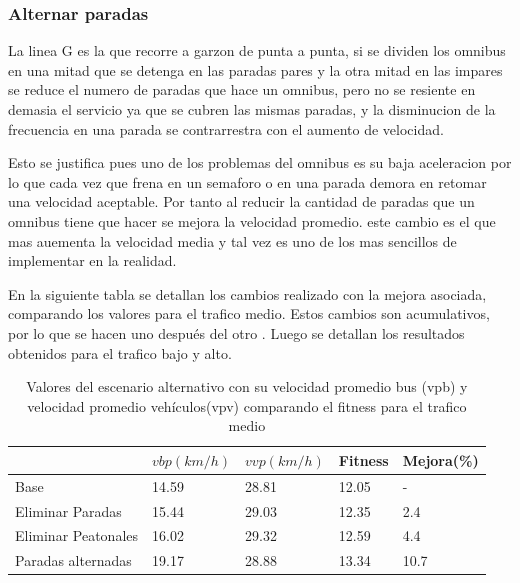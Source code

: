 \subsubsection{Alternar paradas}

La linea G es la que recorre a garzon de punta a punta, si se dividen los omnibus en una mitad que se detenga en las paradas pares y la otra mitad en las impares se reduce el numero de paradas que hace un omnibus, pero no se resiente en demasia el servicio ya que se cubren las mismas paradas, y la disminucion de la frecuencia en una parada se contrarrestra con el aumento de velocidad.

Esto se justifica pues uno de los problemas del omnibus es su baja aceleracion por lo que cada vez que frena en un semaforo o en una parada demora en retomar una velocidad aceptable. Por tanto al reducir la cantidad de paradas que un omnibus tiene que hacer se mejora la velocidad promedio.
este cambio es el que mas auementa la velocidad media y tal vez es uno de los mas sencillos de implementar en la realidad.



En la siguiente tabla se detallan los cambios realizado con la mejora asociada, comparando los valores para el trafico medio. Estos cambios son acumulativos, por lo que se hacen uno después del otro . Luego se detallan los resultados obtenidos para el trafico bajo y alto.


\begin{table}[h]
	\renewcommand{\arraystretch}{1.2}
	\caption{Valores del escenario alternativo con su velocidad promedio bus (vpb) y velocidad promedio vehículos(vpv) comparando el fitness para el trafico medio }
	\label{table:resultado_alternativo}
	\centering
	\begin{tabular}{p{3.5cm}p{2.5cm}p{2.5cm}p{2cm}p{2cm} }
		\hline
		&
		$vbp(km/h)$& 
		$vvp(km/h)$ & 
		Fitness &
		Mejora(\%)
		\\ 
		\hline
		Base & 14.59  & 28.81& 12.05 & -\\
		Eliminar Paradas & 15.44  & 29.03& 12.35 & 2.4\\
		Eliminar Peatonales  & 16.02  & 29.32& 12.59 & 4.4\\
		Paradas alternadas  & 19.17  & 28.88& 13.34 & 10.7\\		
		\hline
	\end{tabular}
\end{table}




